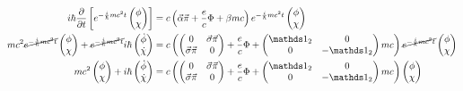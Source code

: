 \begin{align}
  \label{eq:5}
   i\hbar\pdiff_t\left[ e^{-\frac{i}{\hbar}mc^2 t} \begin{pmatrix}  \phi\\\chi \end{pmatrix}\right] &= c\left(\vec \alpha \vec\pi + \frac{e}{c}\Phi   +\beta mc  \right)e^{-\frac{i}{\hbar}mc^2 t} \begin{pmatrix}  \phi\\\chi \end{pmatrix} \notag\\
%
 mc^2  \cancel{e^{-\frac{i}{\hbar}mc^2 t}} \begin{pmatrix}  \phi\\\chi \end{pmatrix} + \cancel{e^{-\frac{i}{\hbar}mc^2 t}} i\hbar\begin{pmatrix}  \dot \phi\\ \dot \chi \end{pmatrix} &= c\left(
   \begin{pmatrix}
     0&\vec \sigma\vec\pi\\
     \vec \sigma\vec\pi&0
   \end{pmatrix}
 + \frac{e}{c}\Phi    +
 \begin{pmatrix}
   \mathds 1_2&0\\
   0&-\mathds 1_2
 \end{pmatrix}
mc  \right)\cancel{e^{-\frac{i}{\hbar}mc^2 t}} \begin{pmatrix}  \phi\\\chi \end{pmatrix} \notag \\
%
 mc^2   \begin{pmatrix}  \phi\\\chi \end{pmatrix} +  i\hbar\begin{pmatrix}  \dot \phi\\ \dot \chi \end{pmatrix} &= c\left(
   \begin{pmatrix}
     0&\vec \sigma\vec\pi\\
     \vec \sigma\vec\pi&0
   \end{pmatrix}
 + \frac{e}{c}\Phi    +
 \begin{pmatrix}
   \mathds 1_2&0\\
   0&-\mathds 1_2
 \end{pmatrix}
mc  \right)\begin{pmatrix}  \phi\\\chi \end{pmatrix}  \notag\\

\end{align}
